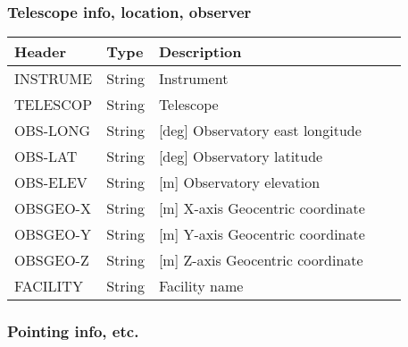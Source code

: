\subsubsection{Telescope info, location, observer}


\begin{tabular}{l l l l l}
\hline
Header & Type & Description \\
\hline
INSTRUME & String & Instrument \\
TELESCOP & String & Telescope \\
OBS-LONG & String & [deg] Observatory east longitude \\
OBS-LAT & String & [deg] Observatory latitude \\
OBS-ELEV & String & [m] Observatory elevation \\
OBSGEO-X & String & [m] X-axis Geocentric coordinate \\
OBSGEO-Y & String & [m] Y-axis Geocentric coordinate \\
OBSGEO-Z & String & [m] Z-axis Geocentric coordinate \\
FACILITY & String & Facility name \\
\hline
\end{tabular}


\subsubsection{Pointing info, etc.}


